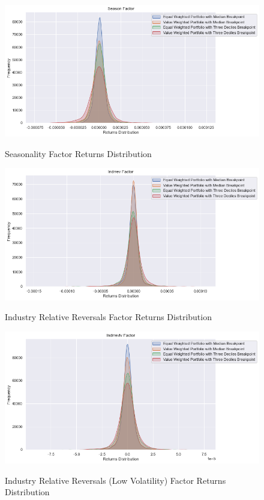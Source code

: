 \begin{figure}[H]
	\caption{Seasonality Factor Returns Distribution}
	\centering
	\includegraphics[scale=.63]{../../output/figures/season.png}
	\label{fig:season}
\end{figure}

\begin{figure}[H]
	\caption{Industry Relative Reversals Factor Returns Distribution}
	\centering
	\includegraphics[scale=.63]{../../output/figures/indrrev.png}
	\label{fig:indrrev}
\end{figure}

\begin{figure}[H]
	\caption{Industry Relative Reversals (Low Volatility) Factor Returns Distribution}
	\centering
	\includegraphics[scale=.63]{../../output/figures/indrrevlv.png}
	\label{fig:indrrevlv}
\end{figure}

